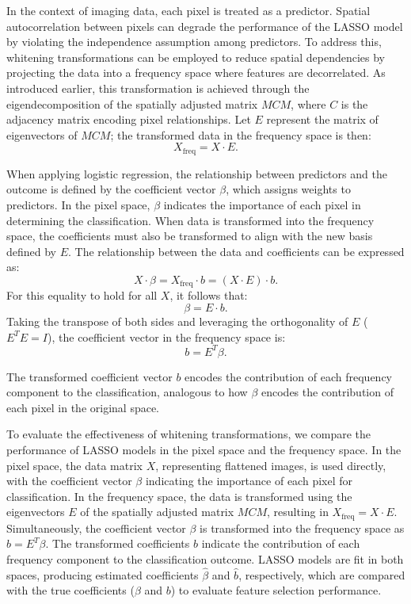 \documentclass[12pt]{article}
\begin{document}
In the context of imaging data, each pixel is treated as a predictor. Spatial autocorrelation between pixels can degrade the performance of the LASSO model by violating the independence assumption among predictors. To address this, whitening transformations can be employed to reduce spatial dependencies by projecting the data into a frequency space where features are decorrelated. As introduced earlier, this transformation is achieved through the eigendecomposition of the spatially adjusted matrix \( MCM \), where \( C \) is the adjacency matrix encoding pixel relationships. Let \( E \) represent the matrix of eigenvectors of \( MCM \); the transformed data in the frequency space is then:
\[
  X_{\text{freq}} = X \cdot E.
\]

When applying logistic regression, the relationship between predictors and the outcome is defined by the coefficient vector \( \beta \), which assigns weights to predictors. In the pixel space, \( \beta \) indicates the importance of each pixel in determining the classification. When data is transformed into the frequency space, the coefficients must also be transformed to align with the new basis defined by \( E \). The relationship between the data and coefficients can be expressed as:
\[
  X \cdot \beta = X_{\text{freq}} \cdot b = (X \cdot E) \cdot b.
\]
For this equality to hold for all \( X \), it follows that:
\[
  \beta = E \cdot b.
\]
Taking the transpose of both sides and leveraging the orthogonality of \( E \) (\( E^T E = I \)), the coefficient vector in the frequency space is:
\[
  b = E^T \beta.
\]

The transformed coefficient vector \( b \) encodes the contribution of each frequency component to the classification, analogous to how \( \beta \) encodes the contribution of each pixel in the original space.

To evaluate the effectiveness of whitening transformations, we compare the performance of LASSO models in the pixel space and the frequency space. In the pixel space, the data matrix \( X \), representing flattened images, is used directly, with the coefficient vector \( \beta \) indicating the importance of each pixel for classification. In the frequency space, the data is transformed using the eigenvectors \( E \) of the spatially adjusted matrix \( MCM \), resulting in \( X_{\text{freq}} = X \cdot E \). Simultaneously, the coefficient vector \( \beta \) is transformed into the frequency space as \( b = E^T \beta \). The transformed coefficients \( b \) indicate the contribution of each frequency component to the classification outcome. LASSO models are fit in both spaces, producing estimated coefficients \( \hat{\beta} \) and \( \hat{b} \), respectively, which are compared with the true coefficients (\( \beta \) and \( b \)) to evaluate feature selection performance.
\end{document}
